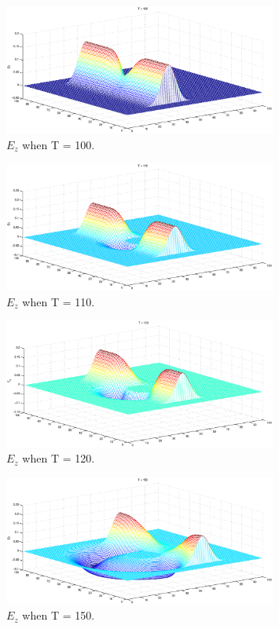 \documentclass[9pt,a4paper]{article}
\begin{document}
\begin{figure}
\centering
\includegraphics[angle=270,
    width=0.8\textwidth]{ez.100.eps}
\caption{$E_z$ when T = 100.}
\label{pic:ez100}
\end{figure}

\begin{figure}
\centering
\includegraphics[angle=270,
    width=0.8\textwidth]{ez.110.eps}
\caption{$E_z$ when T = 110.}
\label{pic:ez110}
\end{figure}

\begin{figure}
\centering
\includegraphics[angle=270,
    width=0.8\textwidth]{ez.120.eps}
\caption{$E_z$ when T = 120.}
\label{pic:ez120}
\end{figure}

\begin{figure}
\centering
\includegraphics[angle=270,
    width=0.8\textwidth]{ez.150.eps}
\caption{$E_z$ when T = 150.}
\label{pic:ez150}
\end{figure}
\end{document}
